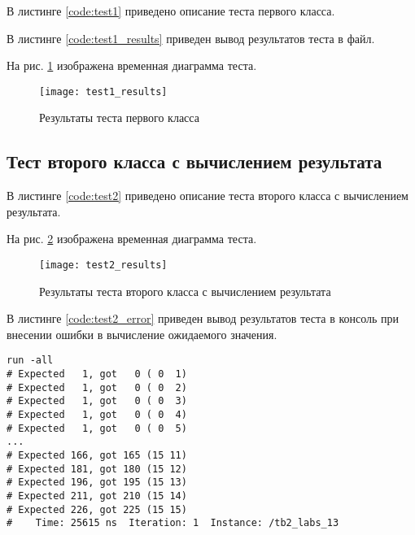 В листинге \ref{code:test1} приведено описание теста первого класса.


В листинге \ref{code:test1_results} приведен вывод результатов теста в файл.


На рис. \ref{fig:test1_results} изображена временная диаграмма теста.
\begin{figure}[H]
	\begin{center}
		\texttt{[image: test1\_results]}
		\caption{Результаты теста первого класса}
		\label{fig:test1_results}
	\end{center}
\end{figure}

\subsection{Тест второго класса с вычислением результата}

В листинге \ref{code:test2} приведено описание теста второго класса с вычислением результата.


На рис. \ref{fig:test2_results} изображена временная диаграмма теста.
\begin{figure}[H]
	\begin{center}
		\texttt{[image: test2\_results]}
		\caption{Результаты теста второго класса с вычислением результата}
		\label{fig:test2_results}
	\end{center}
\end{figure}

В листинге \ref{code:test2_error} приведен вывод результатов теста в консоль при внесении ошибки в вычисление ожидаемого значения.	
\begin{lstlisting}[caption=Результаты ошибочного теста второго класса с вычислением результата, label=code:test2_error, style=console]
run -all
# Expected   1, got   0 ( 0  1)
# Expected   1, got   0 ( 0  2)
# Expected   1, got   0 ( 0  3)
# Expected   1, got   0 ( 0  4)
# Expected   1, got   0 ( 0  5)
...
# Expected 166, got 165 (15 11)
# Expected 181, got 180 (15 12)
# Expected 196, got 195 (15 13)
# Expected 211, got 210 (15 14)
# Expected 226, got 225 (15 15)
#    Time: 25615 ns  Iteration: 1  Instance: /tb2_labs_13
\end{lstlisting}

